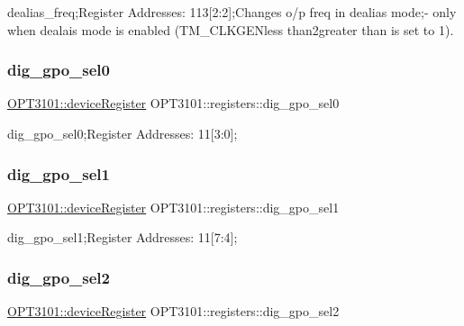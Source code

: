 dealias\+\_\+freq;Register Addresses\+: 113\mbox{[}2\+:2\mbox{]};Changes o/p freq in dealias mode;-\/ only when dealais mode is enabled (T\+M\+\_\+\+C\+L\+K\+G\+E\+Nless than2greater than is set to \textquotesingle{}1\textquotesingle{}). 

\mbox{\label{class_o_p_t3101_1_1registers_a524961a20bb991dfedd371ad04106acb}} 
\subsubsection{\texorpdfstring{dig\+\_\+gpo\+\_\+sel0}{dig\_gpo\_sel0}}
{\footnotesize\ttfamily \mbox{\hyperlink{class_o_p_t3101_1_1device_register}{O\+P\+T3101\+::device\+Register}} O\+P\+T3101\+::registers\+::dig\+\_\+gpo\+\_\+sel0}



dig\+\_\+gpo\+\_\+sel0;Register Addresses\+: 11\mbox{[}3\+:0\mbox{]}; 

\mbox{\label{class_o_p_t3101_1_1registers_aa4838268aa3b89fbd6e03d9f132072bb}} 
\subsubsection{\texorpdfstring{dig\+\_\+gpo\+\_\+sel1}{dig\_gpo\_sel1}}
{\footnotesize\ttfamily \mbox{\hyperlink{class_o_p_t3101_1_1device_register}{O\+P\+T3101\+::device\+Register}} O\+P\+T3101\+::registers\+::dig\+\_\+gpo\+\_\+sel1}



dig\+\_\+gpo\+\_\+sel1;Register Addresses\+: 11\mbox{[}7\+:4\mbox{]}; 

\mbox{\label{class_o_p_t3101_1_1registers_a2274058727c99614f1eccf195ddccd6d}} 
\subsubsection{\texorpdfstring{dig\+\_\+gpo\+\_\+sel2}{dig\_gpo\_sel2}}
{\footnotesize\ttfamily \mbox{\hyperlink{class_o_p_t3101_1_1device_register}{O\+P\+T3101\+::device\+Register}} O\+P\+T3101\+::registers\+::dig\+\_\+gpo\+\_\+sel2}



